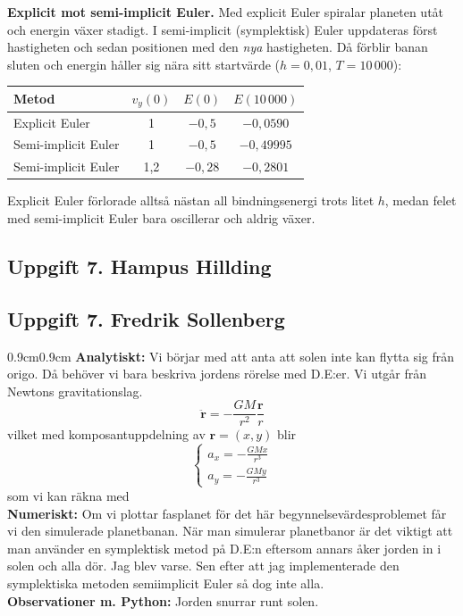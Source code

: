 \documentclass{article}
\begin{document}
\medskip
\textbf{Explicit mot semi-implicit Euler.} Med explicit Euler spiralar
planeten utåt och energin växer stadigt. I semi-implicit (symplektisk) Euler
uppdateras först hastigheten och sedan positionen med den \emph{nya}
hastigheten. Då förblir banan sluten och energin håller sig nära sitt
startvärde ($h = 0{,}01$, $T = 10\,000$):

\begin{center}
\begin{tabular}{l c c c}
\hline
Metod & $v_y(0)$ & $E(0)$ & $E(10\,000)$ \\
\hline
Explicit Euler      & 1   & $-0{,}5$  & $-0{,}0590$ \\
Semi-implicit Euler & 1   & $-0{,}5$  & $-0{,}49995$ \\
Semi-implicit Euler & 1,2 & $-0{,}28$ & $-0{,}2801$ \\
\hline
\end{tabular}
\end{center}

Explicit Euler förlorade alltså nästan all bindningsenergi trots litet $h$,
medan felet med semi-implicit Euler bara oscillerar och aldrig växer.

\subsection*{Uppgift 7. Hampus Hillding}

\subsection*{Uppgift 7. Fredrik Sollenberg}
\begin{adjustwidth}{0.9cm}{0.9cm}
\textbf{Analytiskt:} Vi börjar med att anta att solen inte kan flytta sig från origo. Då behöver vi bara beskriva jordens rörelse med D.E:er. Vi utgår från Newtons gravitationslag. 
\[
\ddot{\textbf{r}}=-\frac{GM}{r^2}\frac{\textbf{r}}{r}
\]
vilket med komposantuppdelning av $\textbf{r} = (x,y)$ blir 
\[
\begin{cases}
    a_x=-\frac{GMx}{r^3}\\
    a_y=-\frac{GMy}{r^3}
\end{cases}
\]
som vi kan räkna med 
\medskip\\
\textbf{Numeriskt:} Om vi plottar fasplanet för det här begynnelsevärdesproblemet får vi den simulerade planetbanan. När man simulerar planetbanor är det viktigt att man använder en symplektisk metod på D.E:n eftersom annars åker jorden in i solen och alla dör. Jag blev varse. Sen efter att jag implementerade den symplektiska metoden semiimplicit Euler så dog inte alla. 
\medskip\\
\textbf{Observationer m. Python:} Jorden snurrar runt solen. 
\end{adjustwidth}
\end{document}
